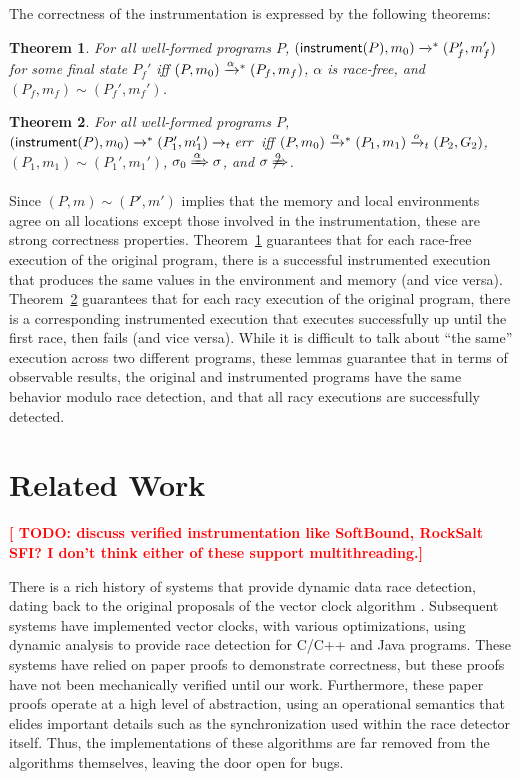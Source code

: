 \documentclass[preprint, 10pt]{sigplanconf}
\newcommand{\TODO}[1]{\textbf{\textcolor{red}{[ TODO: #1]}}}
\newcommand{\instrp}[1]{\ensuremath{\mathsf{instrument}(#1)}}
\newcommand{\cfg}[2]{\ensuremath{(#1, #2)}}
\newcommand{\execstar}[4]{\ensuremath{\cfg{#1}{#2} \tto{#3} #4}}
\newcommand{\execs}[3]{\ensuremath{ \xrightarrow{#2}_{#1} #3}}
\newcommand{\tto}[1]{\mathrel{
  \vphantom{\xrightarrow{#1}}
  \smash{\xrightarrow{#1}}
  \vphantom{\to}^{*}}
}
\newtheorem{theorem}{Theorem}
\begin{document}
The correctness of the instrumentation is expressed by the following theorems:
\begin{theorem}\label{safe}For all well-formed programs $P$, $\execstar{\instrp{P}}{m_0}{}{(P_f', m_f')}$ for some final state $P_f'$ iff $\execstar{P}{m_0}{\alpha}{(P_f, m_f)}$, $\alpha$ is race-free, and $(P_f, m_f) \sim (P_f', m_f')$.\end{theorem}

\begin{theorem}\label{race}For all well-formed programs $P$, $\execstar{\instrp{P}}{m_0}{}{(P_1', m_1')} \execs{t}{}{\mathit{err}}$ iff $\execstar{P}{m_0}{\alpha}{(P_1, m_1)} \execs{t}{o}{(P_2, G_2)}$, $(P_1, m_1) \sim (P_1', m_1')$, $\sigma_0 \xRightarrow{\alpha} \sigma$, and $\sigma \not\xRightarrow{o}$.\end{theorem}
Since $(P, m) \sim (P', m')$ implies that the memory and local environments agree on all locations except those involved in the instrumentation, these are strong correctness properties. Theorem~\ref{safe} guarantees that for each race-free execution of the original program, there is a successful instrumented execution that produces the same values in the environment and memory (and vice versa). Theorem~\ref{race} guarantees that for each racy execution of the original program, there is a corresponding instrumented execution that executes successfully up until the first race, then fails (and vice versa). While it is difficult to talk about ``the same'' execution across two different programs, these lemmas guarantee that in terms of observable results, the original and instrumented programs have the same behavior modulo race detection, and that all racy executions are successfully detected.

\section{Related Work}
\label{related}

\TODO{discuss verified instrumentation like SoftBound, RockSalt SFI? I don't think either of these support multithreading.}

There is a rich history of systems that provide dynamic data race detection, dating back to the original proposals of the vector clock algorithm \cite{vcfidge,vcmattern,lamporthb}. Subsequent systems have implemented vector clocks, with various optimizations, using dynamic analysis to provide race detection for C/C++ \cite{pozniansky_efficient_2003,serebryany_threadsanitizer:_2009} and Java \cite{christiaens_trade:_2001,elmas_goldilocks:_2007,fasttrack,flanagan_fasttrack:_2010,slimstate} programs. These systems have relied on paper proofs to demonstrate correctness, but these proofs have not been mechanically verified until our work. Furthermore, these paper proofs operate at a high level of abstraction, using an operational semantics that elides important details such as the synchronization used within the race detector itself. Thus, the implementations of these algorithms are far removed from the algorithms themselves, leaving the door open for bugs.
\end{document}
